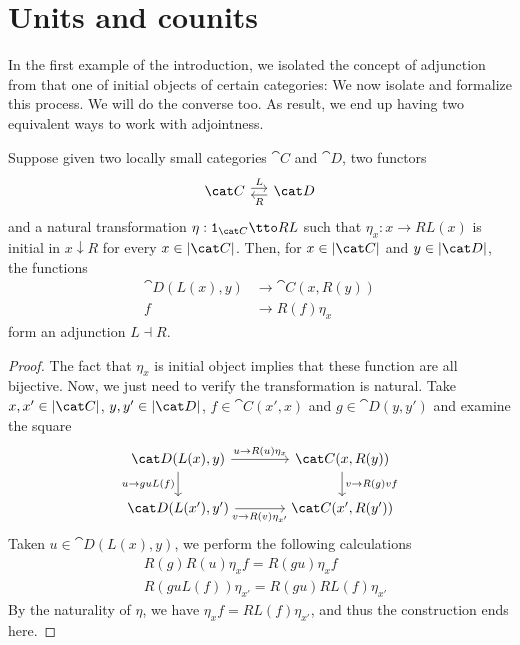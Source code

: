 
\section{Units and counits}

In the first example of the introduction, we isolated the concept of adjunction from that one of initial objects of certain categories: We now isolate and formalize this process. We will do the converse too. As result, we end up having two equivalent ways to work with adjointness.

\begin{proposition}
Suppose given two locally small categories \(\cat C\) and \(\cat D\), two functors
\[\begin{tikzcd}[column sep=small]
\cat C \ar["L", r, shift left] & \cat D \ar["R", l, shift left]
\end{tikzcd}\]
and a natural transformation \(\eta : \id_{\cat C} \tto RL\) such that \(\eta_x : x \to RL(x)\) is initial in \(x {\downarrow} R\)  for every \(x \in \obj{\cat C}\).  Then, for \(x \in \obj{\cat C}\) and \(y \in \obj{\cat D}\), the functions
\begin{align*}
\cat D(L(x), y) &\to \cat C(x, R(y))\\
f &\to R(f)\eta_x
\end{align*}
form an adjunction \(L \dashv R\).
\end{proposition}

\begin{proof}
The fact that \(\eta_x\) is initial object implies that these function are all bijective. Now, we just need to verify the transformation is natural. Take \(x, x' \in \obj{\cat C}\), \(y, y' \in \obj{\cat D}\), \(f \in \cat C(x', x)\) and \(g \in \cat D(y, y')\) and examine the square
\[\begin{tikzcd}[column sep=large]
\cat D(L(x), y) \ar["{u \to R(u) \eta_x}", r] \ar["{u \to guL(f)}", d, swap] & \cat C(x, R(y)) \ar["{v \to R(g)v f}", d] \\
\cat D(L(x'), y') \ar["{v \to R(v) \eta_{x'}}", r, swap] & \cat C(x', R(y'))
\end{tikzcd}\]
Taken \(u \in \cat D(L(x), y)\), we perform the following calculations
\begin{align*}
& R(g) R(u) \eta_x f = R(gu) \eta_x f \\
& R(guL(f)) \eta_{x'} = R(gu) RL(f) \eta_{x'}
\end{align*}
By the naturality of \(\eta\), we have \(\eta_x f = RL(f) \eta_{x'}\), and thus the construction ends here.
\end{proof}


